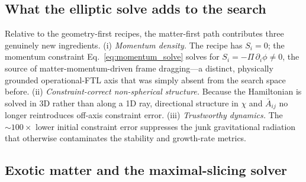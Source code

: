 \documentclass[twocolumn,floatfix,aps,prd,nofootinbib]{revtex4-2}
\begin{document}
\subsection{What the elliptic solve adds to the search}

Relative to the geometry-first recipes, the matter-first path contributes three
genuinely new ingredients.  (i) \emph{Momentum density.}  The recipe has
$S_i=0$; the momentum constraint Eq.~\eqref{eq:momentum_solve} solves for
$S_i=-\Pi\,\partial_i\phi\neq0$, the source of matter-momentum-driven frame
dragging---a distinct, physically grounded operational-FTL axis that was simply
absent from the search space before.  (ii) \emph{Constraint-correct
non-spherical structure.}  Because the Hamiltonian is solved in 3D rather than
along a 1D ray, directional structure in $\chi$ and $\bar A_{ij}$ no longer
reintroduces off-axis constraint error.  (iii) \emph{Trustworthy dynamics.}  The
$\sim100\times$ lower initial constraint error suppresses the junk gravitational
radiation that otherwise contaminates the stability and growth-rate metrics.

\subsection{Exotic matter and the maximal-slicing solver}
\label{sec:exotic_solver}
\end{document}
